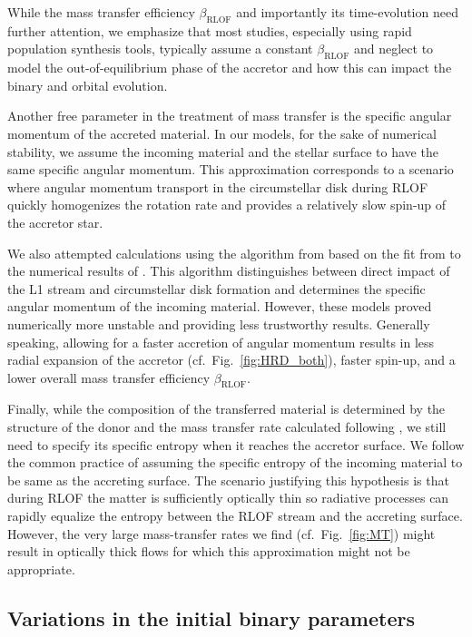 \documentclass[twocolumn,twocolappendix,trackchanges]{aastex63}
\DeclareRobustCommand{\Figref}[1]{Fig.~\ref{#1}}
\begin{document}
While the mass transfer efficiency $\beta_\mathrm{RLOF}$ and
importantly its time-evolution need further attention, we emphasize that most studies, especially
using rapid population synthesis tools, typically assume a
constant $\beta_\mathrm{RLOF}$ and neglect to model the
out-of-equilibrium phase of the accretor and how this can impact the
binary and orbital evolution.

Another free parameter in the treatment of mass transfer is the
specific angular momentum of the accreted material. In our models, for
the sake of numerical stability, we assume the incoming material and
the stellar surface to have the same specific angular momentum. This
approximation corresponds to a scenario where angular momentum
transport in the circumstellar disk during RLOF quickly homogenizes
the rotation rate and provides a relatively slow spin-up of the
accretor star.

We also attempted calculations using the algorithm from
\cite{demink:13} based on the fit from \cite{ulrich:76} to the
numerical results of \cite{lubow:75}. This algorithm distinguishes between
direct impact of the L1 stream and circumstellar disk
formation and determines the specific angular momentum of the incoming
material. However, these models proved numerically more unstable and
providing less trustworthy results. Generally speaking, allowing for a
faster accretion of angular momentum results in less radial expansion
of the accretor (cf.~\Figref{fig:HRD_both}), faster spin-up, and a lower overall mass
transfer efficiency $\beta_\mathrm{RLOF}$.

Finally, while the composition of the transferred material is
determined by the structure of the donor and the mass transfer rate
calculated following \cite{kolb:90}, we still need to specify its
specific entropy when it reaches the accretor surface. We follow the
common practice of assuming the specific entropy of the incoming
material to be same as the accreting surface. The scenario justifying
this hypothesis is that during RLOF the matter is
sufficiently optically thin so radiative processes can rapidly
equalize the entropy between the RLOF stream and the accreting
surface. However, the very large mass-transfer rates we find
(cf.~\Figref{fig:MT}) might result in optically thick flows for which
this approximation might not be appropriate.

\subsection{Variations in the initial binary parameters}
\label{sec:bin_init}
\end{document}
